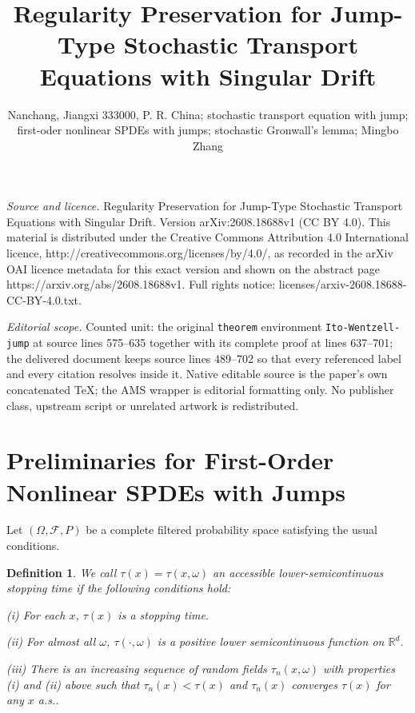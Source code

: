 \documentclass[10pt,a4paper]{amsart}
\newtheorem{definition}[theorem]{Definition}
\def\mR{{\mathbb R}}
\def\sF{{\mathscr F}}
\numberwithin{equation}{section}
\begin{document}
\title[Regularity Preservation for Jump-Type Stochastic Transport E]{Regularity Preservation for Jump-Type Stochastic Transport Equations with Singular Drift}
\author{Nanchang, Jiangxi 333000, P. R. China; stochastic transport equation with jump; first-oder nonlinear SPDEs with jumps; stochastic Gronwall's lemma; Mingbo Zhang}
\date{}
\maketitle
\noindent\emph{Source and licence.} Regularity Preservation for Jump-Type Stochastic Transport Equations with Singular Drift. Version arXiv:2608.18688v1 (CC BY 4.0). This material is distributed under the Creative Commons Attribution 4.0 International licence, http://creativecommons.org/licenses/by/4.0/, as recorded in the arXiv OAI licence metadata for this exact version and shown on the abstract page https://arxiv.org/abs/2608.18688v1. Full rights notice: licenses/arxiv-2608.18688-CC-BY-4.0.txt.\par\smallskip
\noindent\textit{Editorial scope.} Counted unit: the original \texttt{theorem} environment \texttt{Ito-Wentzell-jump} at source lines 575--635 together with its complete proof at lines 637--701; the delivered document keeps source lines 489--702 so that every referenced label and every citation resolves inside it. Native editable source is the paper's own concatenated TeX; the AMS wrapper is editorial formatting only. No publisher class, upstream script or unrelated artwork is redistributed.
\section{Preliminaries for First-Order Nonlinear SPDEs with Jumps}
Let $(\Omega,\sF,P)$ be a complete filtered probability space satisfying the usual conditions.

\begin{definition}
We call $\tau(x)=\tau(x,\omega)$ an accessible lower-semicontinuous stopping time if the following conditions hold:

(i) For each $x$, $\tau(x)$ is a stopping time.

(ii) For almost all $\omega$, $\tau(\cdot,\omega)$ is a positive lower semicontinuous function on $\mR^d$.

(iii) There is an increasing sequence of random fields $\tau_n(x,\omega)$ with  properties (i) and (ii) above such that $\tau_n(x)<\tau(x)$ and $\tau_n(x)$ converges $\tau(x)$ for any $x$ a.s..
\end{definition}
\end{document}

